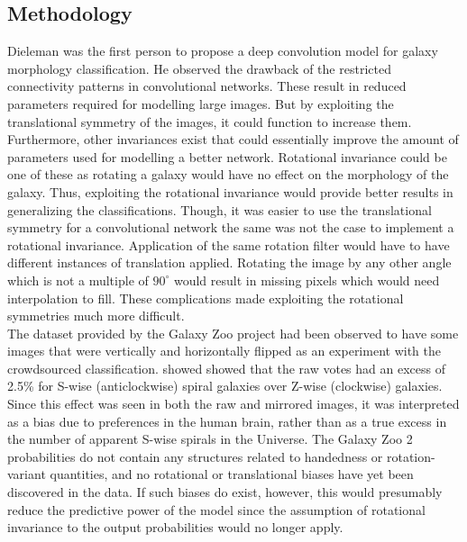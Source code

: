 \documentclass[a4paper,12pt]{report}
\begin{document}
\subsection{Methodology}
\hspace*{0.5 in}Dieleman was the first person to propose a deep convolution model for galaxy morphology classification. He observed the drawback of the restricted connectivity patterns in convolutional networks. These result in reduced parameters required for modelling large images. But by exploiting the translational symmetry of the images, it could function to increase them. Furthermore, other invariances exist that could essentially improve the amount of parameters used for modelling a better network. Rotational invariance could be one of these as rotating a galaxy would have no effect on the morphology of the galaxy. Thus, exploiting the rotational invariance would provide better results in generalizing the classifications. Though, it was easier to use the translational symmetry for a convolutional network the same was not the case to implement a rotational invariance. Application of the same rotation filter would have to have different instances of translation applied. Rotating the image by any other angle which is not a multiple of $90^{\circ}$ would result in missing pixels which would need interpolation to fill. These complications made exploiting the rotational symmetries much more difficult.\\
\hspace*{0.5 in}The dataset provided by the Galaxy Zoo project had been observed to have some images that were vertically and horizontally flipped as an experiment with the crowdsourced classification. \citet{Land_et_all_2008} showed showed that the raw votes had an excess of 2.5\% for S-wise (anticlockwise) spiral galaxies over Z-wise (clockwise) galaxies. Since this effect was seen in both the raw and mirrored images, it was interpreted as a bias due to preferences in the human brain, rather than as a true excess in the number of apparent S-wise spirals in the Universe. The Galaxy Zoo 2 probabilities do not contain any structures related to handedness or rotation-variant quantities, and no rotational or translational biases have yet been discovered in the data. If such biases do exist, however, this would presumably reduce the predictive power of the model since the assumption of rotational
invariance to the output probabilities would no longer apply.\\
\end{document}
